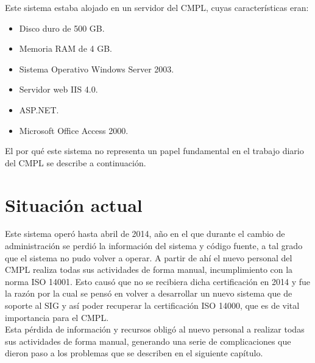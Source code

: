 	Este sistema estaba alojado en un servidor del CMPL, cuyas características eran:
	
	\begin{itemize}
		\item Disco duro de 500 GB.
		\item Memoria RAM de 4 GB.
		\item Sistema Operativo Windows Server 2003.
		\item Servidor web IIS 4.0.
		\item ASP.NET.
		\item Microsoft Office Access 2000.
	\end{itemize}
	
	El por qué este sistema no representa un papel fundamental en el trabajo diario del CMPL se describe a continuación.
		
	\section{Situación actual}
	Este sistema operó hasta abril de 2014, año en el que durante el cambio de administración se perdió la información del sistema y código fuente, a  tal grado que el sistema no pudo volver a operar. A partir de ahí el nuevo personal del CMPL realiza todas sus actividades de forma manual, incumplimiento con la norma ISO 14001. Esto causó que no se recibiera dicha certificación en 2014 y fue la razón por la cual se pensó en volver a desarrollar un nuevo sistema que de soporte al SIG y así poder recuperar la certificación ISO 14000, que es de vital importancia para el CMPL.\\
	
	Esta pérdida de información y recursos obligó al nuevo personal a realizar todas sus actividades de forma manual, generando una serie de complicaciones que dieron paso a los problemas que se describen en el siguiente capítulo.
